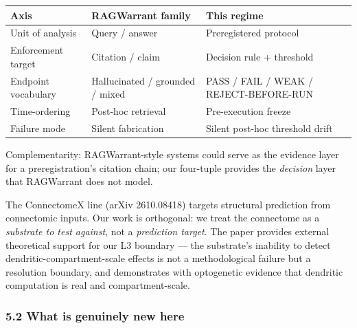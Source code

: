 \documentclass[
]{article}
\newcounter{none} %
\begin{document}
{\def\LTcaptype{none} %
\begin{longtable}[]{@{}
  >{\raggedright\arraybackslash}p{}
  >{\raggedright\arraybackslash}p{}
  >{\raggedright\arraybackslash}p{}@{}}
\toprule\noalign{}
\begin{minipage}[b]{\linewidth}\raggedright
Axis
\end{minipage} & \begin{minipage}[b]{\linewidth}\raggedright
RAGWarrant family
\end{minipage} & \begin{minipage}[b]{\linewidth}\raggedright
This regime
\end{minipage} \\
\midrule\noalign{}
\endhead
\bottomrule\noalign{}
\endlastfoot
Unit of analysis & Query / answer & Preregistered protocol \\
Enforcement target & Citation / claim & Decision rule + threshold \\
Endpoint vocabulary & Hallucinated / grounded / mixed & PASS / FAIL /
WEAK / REJECT-BEFORE-RUN \\
Time-ordering & Post-hoc retrieval & Pre-execution freeze \\
Failure mode & Silent fabrication & Silent post-hoc threshold drift \\
\end{longtable}
}

Complementarity: RAGWarrant-style systems could serve as the evidence
layer for a preregistration's citation chain; our four-tuple provides
the \emph{decision} layer that RAGWarrant does not model.

The ConnectomeX line (arXiv 2610.08418) targets structural prediction
from connectomic inputs. Our work is orthogonal: we treat the connectome
as a \emph{substrate to test against}, not a \emph{prediction target}.
The \citet{ref35} paper provides external theoretical support for our L3
boundary --- the substrate's inability to detect
dendritic-compartment-scale effects is not a methodological failure but
a resolution boundary, and \citet{ref35} demonstrates with optogenetic
evidence that dendritic computation is real and compartment-scale.

\subsubsection{5.2 What is genuinely new
here}\label{what-is-genuinely-new-here}
\end{document}
